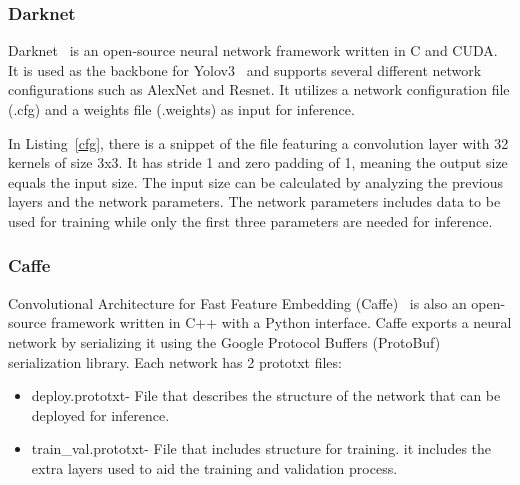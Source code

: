 \documentclass[conference]{IEEEtran}
\begin{document}
\subsubsection{Darknet}

Darknet~\cite{Darknet} is an open-source neural network framework written in C
and CUDA. It is used as the backbone for Yolov3~\cite{yolov3} and supports
several different network configurations such as AlexNet and Resnet.  It
utilizes a network configuration file (.cfg) and a weights file (.weights) as
input for inference.

\begin{figure}[!htb]

\end{figure}

In Listing~\ref{cfg}, there is a snippet of the file featuring a convolution
layer with 32 kernels of size 3x3. It has stride 1 and zero padding of 1,
meaning the output size equals the input size. The input size can be
calculated by analyzing the previous layers and the network parameters. The
network parameters includes data to be used for training while only
the first three parameters are needed for inference.

% 


\subsubsection{Caffe}

Convolutional Architecture for Fast Feature Embedding (Caffe)~\cite{caffe} is
also an open-source framework written in C++ with a Python interface.  Caffe
exports a neural network by serializing it using the Google Protocol Buffers
(ProtoBuf) serialization library. Each network has 2 prototxt files:
\begin{itemize}
    \item deploy.prototxt- File that describes the structure of the network that
      can be deployed for inference.
    \item train\_val.prototxt- File that includes structure for training.  it
      includes the extra layers used to aid the training and validation process.
\end{itemize}
\end{document}
